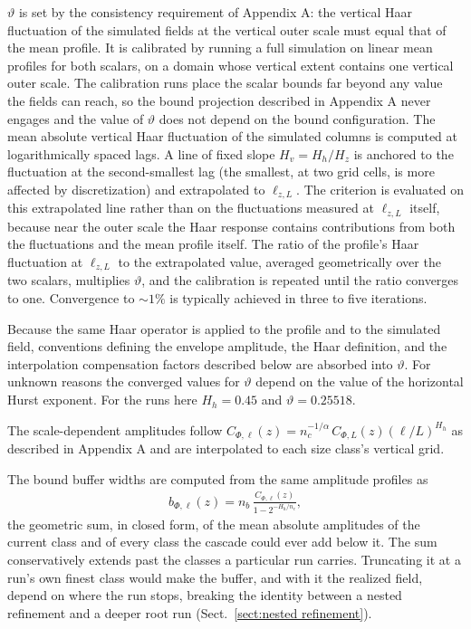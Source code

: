\documentclass{article}
\begin{document}
$\vartheta$ is set by the consistency requirement of Appendix A: the
vertical Haar fluctuation of the simulated fields at the vertical outer
scale must equal that of the mean profile. It is calibrated by running
a full simulation on linear mean profiles for both scalars, on a domain
whose vertical extent contains one vertical outer scale. The
calibration runs place the scalar bounds far beyond any value the
fields can reach, so the bound projection described in Appendix A never engages and the value of $\vartheta$ does not depend on the bound configuration.
The mean
absolute vertical Haar fluctuation of the simulated columns is computed
at logarithmically spaced lags. A line of fixed slope $H_v = H_h/H_z$ is
anchored to the fluctuation at the second-smallest lag (the smallest,
at two grid cells, is more affected by discretization) and extrapolated to
$\ell_{z,L}$. The criterion is evaluated on this extrapolated line rather
than on the fluctuations measured at $\ell_{z,L}$ itself, because near the
outer scale the Haar response contains contributions from both the fluctuations and the mean profile itself. The ratio of
the profile's Haar fluctuation at $\ell_{z,L}$ to the extrapolated value,
averaged geometrically over the two scalars, multiplies $\vartheta$, and
the calibration is repeated until the ratio converges to one. Convergence to $\sim 1\%$ is typically achieved in three to five iterations.

Because
the same Haar operator is applied to the profile and to the simulated
field, conventions defining the envelope amplitude, the Haar definition, and the interpolation compensation factors described below are absorbed
into $\vartheta$. For unknown reasons the converged values for $\vartheta$ depend on the value of the horizontal Hurst exponent. For the runs here $H_h = 0.45$ and $\vartheta = 0.25518$. 

The scale-dependent amplitudes
follow $C_{\Phi,\ell}(z) = n_c^{-1/\alpha}\, C_{\Phi,L}(z)(\ell/L)^{H_h}$
as described in Appendix A and are interpolated
to each size class's vertical grid.

The bound buffer widths are computed from the same amplitude profiles
as
\begin{align}
  b_{\Phi,\ell}(z) = n_b\, \frac{C_{\Phi,\ell}(z)}{1 - 2^{-H_h/n_c}},
\end{align}
the geometric sum, in closed form, of the mean absolute amplitudes of
the current class and of every class the cascade could ever add below
it. The sum conservatively extends past the classes a particular run
carries. Truncating it at a run's own finest class would make the
buffer, and with it the realized field, depend on where the run stops,
breaking the identity between a nested refinement and a deeper root
run (Sect.~\ref{sect:nested refinement}).
\end{document}
